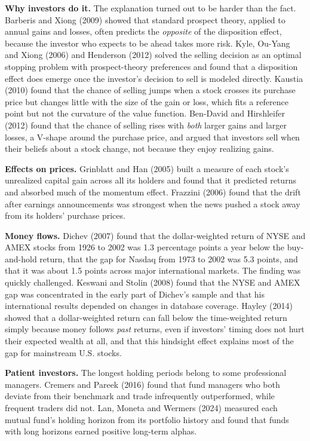 \textbf{Why investors do it.} The explanation turned out to be harder than the fact. Barberis and Xiong (2009) showed that standard prospect theory, applied to annual gains and losses, often predicts the \emph{opposite} of the disposition effect, because the investor who expects to be ahead takes more risk. Kyle, Ou-Yang and Xiong (2006) and Henderson (2012) solved the selling decision as an optimal stopping problem with prospect-theory preferences and found that a disposition effect does emerge once the investor's decision to sell is modeled directly. Kaustia (2010) found that the chance of selling jumps when a stock crosses its purchase price but changes little with the size of the gain or loss, which fits a reference point but not the curvature of the value function. Ben-David and Hirshleifer (2012) found that the chance of selling rises with \emph{both} larger gains and larger losses, a V-shape around the purchase price, and argued that investors sell when their beliefs about a stock change, not because they enjoy realizing gains.

\textbf{Effects on prices.} Grinblatt and Han (2005) built a measure of each stock's unrealized capital gain across all its holders and found that it predicted returns and absorbed much of the momentum effect. Frazzini (2006) found that the drift after earnings announcements was strongest when the news pushed a stock away from its holders' purchase prices.

\textbf{Money flows.} Dichev (2007) found that the dollar-weighted return of NYSE and AMEX stocks from 1926 to 2002 was 1.3 percentage points a year below the buy-and-hold return, that the gap for Nasdaq from 1973 to 2002 was 5.3 points, and that it was about 1.5 points across major international markets. The finding was quickly challenged. Keswani and Stolin (2008) found that the NYSE and AMEX gap was concentrated in the early part of Dichev's sample and that his international results depended on changes in database coverage. Hayley (2014) showed that a dollar-weighted return can fall below the time-weighted return simply because money follows \emph{past} returns, even if investors' timing does not hurt their expected wealth at all, and that this hindsight effect explains most of the gap for mainstream U.S. stocks.

\textbf{Patient investors.} The longest holding periods belong to some professional managers. Cremers and Pareek (2016) found that fund managers who both deviate from their benchmark and trade infrequently outperformed, while frequent traders did not. Lan, Moneta and Wermers (2024) measured each mutual fund's holding horizon from its portfolio history and found that funds with long horizons earned positive long-term alphas.


